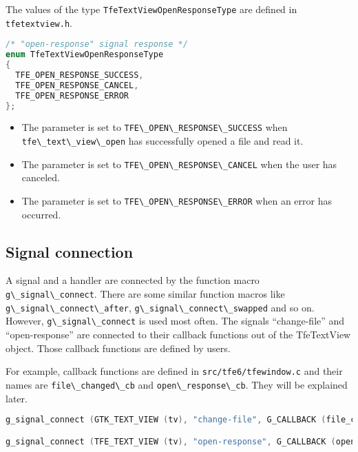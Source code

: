 The values of the type
\passthrough{\lstinline!TfeTextViewOpenResponseType!} are defined in
\passthrough{\lstinline!tfetextview.h!}.

\begin{lstlisting}[language=C]
/* "open-response" signal response */
enum TfeTextViewOpenResponseType
{
  TFE_OPEN_RESPONSE_SUCCESS,
  TFE_OPEN_RESPONSE_CANCEL,
  TFE_OPEN_RESPONSE_ERROR
};
\end{lstlisting}

\begin{itemize}
\tightlist
\item
  The parameter is set to
  \passthrough{\lstinline!TFE\_OPEN\_RESPONSE\_SUCCESS!} when
  \passthrough{\lstinline!tfe\_text\_view\_open!} has successfully
  opened a file and read it.
\item
  The parameter is set to
  \passthrough{\lstinline!TFE\_OPEN\_RESPONSE\_CANCEL!} when the user
  has canceled.
\item
  The parameter is set to
  \passthrough{\lstinline!TFE\_OPEN\_RESPONSE\_ERROR!} when an error has
  occurred.
\end{itemize}

\subsection{Signal connection}\label{signal-connection}

A signal and a handler are connected by the function macro
\passthrough{\lstinline!g\_signal\_connect!}. There are some similar
function macros like
\passthrough{\lstinline!g\_signal\_connect\_after!},
\passthrough{\lstinline!g\_signal\_connect\_swapped!} and so on.
However, \passthrough{\lstinline!g\_signal\_connect!} is used most
often. The signals ``change-file'' and ``open-response'' are connected
to their callback functions out of the TfeTextView object. Those
callback functions are defined by users.

For example, callback functions are defined in
\passthrough{\lstinline!src/tfe6/tfewindow.c!} and their names are
\passthrough{\lstinline!file\_changed\_cb!} and
\passthrough{\lstinline!open\_response\_cb!}. They will be explained
later.

\begin{lstlisting}[language=C]
g_signal_connect (GTK_TEXT_VIEW (tv), "change-file", G_CALLBACK (file_changed_cb), nb);

g_signal_connect (TFE_TEXT_VIEW (tv), "open-response", G_CALLBACK (open_response_cb), nb);
\end{lstlisting}

